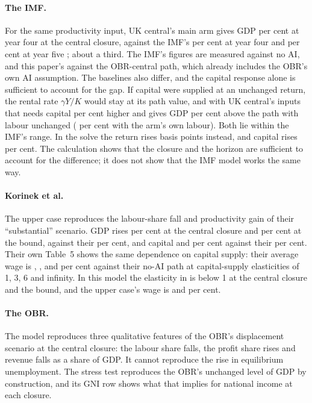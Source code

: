 \paragraph{The IMF.} For the same productivity input, UK central's main arm gives GDP \genUkCentralMainGdpCentral{} per cent at year four at the central closure, against the IMF's \genImfOutputYFourPct{} per cent at year four and \genImfOutputYFivePct{} per cent at year five \citep{imf2026sip}; about a third. The IMF's figures are measured against no AI, and this paper's against the OBR-central path, which already includes the OBR's own AI assumption. The baselines also differ, and the capital response alone is sufficient to account for the gap. If capital were supplied at an unchanged return, the rental rate $\gamma Y/K$ would stay at its path value, and with UK central's inputs that needs capital \genElasticBoundKPct{} per cent higher and gives GDP \genElasticBoundGdpPct{} per cent above the path with labour unchanged (\genElasticBoundGdpOwnLPct{} per cent with the arm's own labour). Both lie within the IMF's range. In the solve the return rises \genUkCentralMainInterestBpCentralAbs{} basis points instead, and capital rises \genUkCentralMainCapitalCentralAbs{} per cent. The calculation shows that the closure and the horizon are sufficient to account for the difference; it does not show that the IMF model works the same way.

\paragraph{Korinek et al.} The upper case reproduces the labour-share fall and productivity gain of their ``substantial'' scenario. GDP rises \genKorinekMainGdpCentralAbs{} per cent at the central closure and \genKorinekMainGdpBoundAbs{} per cent at the bound, against their \genKorinekTableGdpPct{} per cent, and capital \genKorinekMainCapitalCentralAbs{} and \genKorinekMainCapitalBoundAbs{} per cent against their \genKorinekTableCapitalPct{} per cent. Their own Table~5 shows the same dependence on capital supply: their average wage is \genKorinekTableFiveWageOne{}, \genKorinekTableFiveWageThree{}, \genKorinekTableFiveWageSix{} and \genKorinekTableFiveWageInf{} per cent against their no-AI path at capital-supply elasticities of 1, 3, 6 and infinity. In this model the elasticity in \genHeadYear{} is below 1 at the central closure and the bound, and the upper case's wage is \genKorinekMainWageCentral{} and \genKorinekMainWageBound{} per cent.

\paragraph{The OBR.} The model reproduces three qualitative features of the OBR's displacement scenario at the central closure: the labour share falls, the profit share rises and revenue falls as a share of GDP. It cannot reproduce the rise in equilibrium unemployment. The stress test reproduces the OBR's unchanged level of GDP by construction, and its GNI row shows what that implies for national income at each closure.
